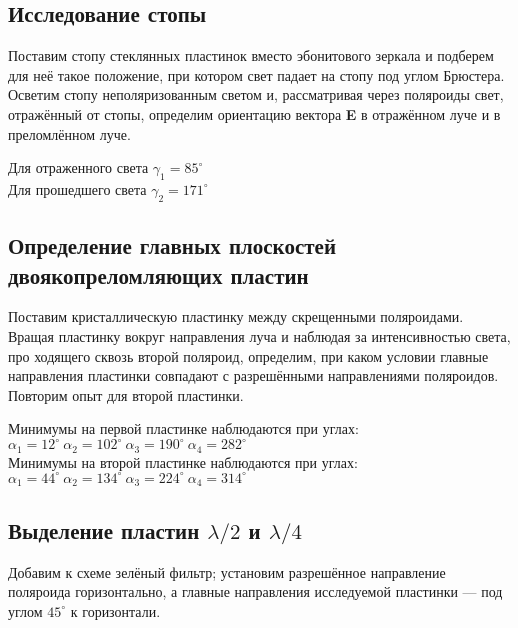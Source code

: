 	\subsection*{Исследование стопы}
	
	Поставим стопу стеклянных пластинок вместо эбонитового зеркала и подберем для неё такое положение, при котором свет падает на стопу под углом Брюстера. Осветим стопу неполяризованным светом и, рассматривая через поляроиды свет, отражённый от стопы, определим ориентацию вектора
	\textbf{E} в отражённом луче и в преломлённом луче.
		
	\begin{center}
		Для отраженного света $\gamma_1 = 85^{\circ}$ \\
		Для прошедшего света $\gamma_2 = 171^{\circ}$
	\end{center} 

	\subsection*{Определение главных плоскостей двоякопреломляющих пластин}
	
	Поставим кристаллическую пластинку между скрещенными поляроидами. Вращая пластинку вокруг направления луча и наблюдая за интенсивностью света, про ходящего сквозь второй поляроид, определим, при каком условии главные направления пластинки совпадают с разрешёнными направлениями поляроидов. Повторим опыт для второй пластинки.
	
	\begin{center}
		Минимумы на первой пластинке наблюдаются при углах:\\
		$\alpha_1 = 12^{\circ} ~ \alpha_2 = 102^{\circ} ~ \alpha_3 = 190^{\circ} ~ \alpha_4 = 282^{\circ}$\\
		Минимумы на второй пластинке наблюдаются при углах:\\
		$\alpha_1 = 44^{\circ} ~ \alpha_2 = 134^{\circ} ~ \alpha_3 = 224^{\circ} ~ \alpha_4 = 314^{\circ}$\\
	\end{center}
	
	\subsection*{Выделение пластин $\lambda/2$ и $\lambda/4$}
	Добавим к схеме зелёный фильтр; установим разрешённое направление поляроида горизонтально, а главные направления исследуемой пластинки — под углом $45^{\circ}$ к горизонтали.
	
